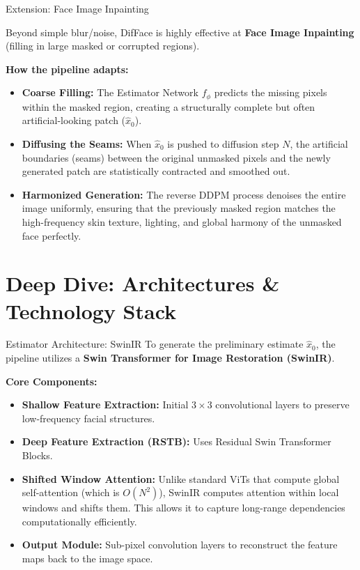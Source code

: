\documentclass[aspectratio=169]{beamer}
\begin{document}
\begin{frame}{Extension: Face Image Inpainting}
    
    
    Beyond simple blur/noise, DifFace is highly effective at \textbf{Face Image Inpainting} (filling in large masked or corrupted regions).
    
    \vspace{0.2cm}
    \textbf{How the pipeline adapts:}
    \begin{itemize}
        \item \textbf{Coarse Filling:} The Estimator Network $f_\phi$ predicts the missing pixels within the masked region, creating a structurally complete but often artificial-looking patch ($\hat{x}_0$).
        \item \textbf{Diffusing the Seams:} When $\hat{x}_0$ is pushed to diffusion step $N$, the artificial boundaries (seams) between the original unmasked pixels and the newly generated patch are statistically contracted and smoothed out.
        \item \textbf{Harmonized Generation:} The reverse DDPM process denoises the entire image uniformly, ensuring that the previously masked region matches the high-frequency skin texture, lighting, and global harmony of the unmasked face perfectly.
    \end{itemize}
\end{frame}

\section{Deep Dive: Architectures \& Technology Stack}

\begin{frame}{Estimator Architecture: SwinIR}
    To generate the preliminary estimate $\hat{x}_0$, the pipeline utilizes a \textbf{Swin Transformer for Image Restoration (SwinIR)}.
    
    \vspace{0.2cm}
    \textbf{Core Components:}
    \begin{itemize}
        \item \textbf{Shallow Feature Extraction:} Initial $3 \times 3$ convolutional layers to preserve low-frequency facial structures.
        \item \textbf{Deep Feature Extraction (RSTB):} Uses Residual Swin Transformer Blocks.
        \item \textbf{Shifted Window Attention:} Unlike standard ViTs that compute global self-attention (which is $O(N^2)$), SwinIR computes attention within local windows and shifts them. This allows it to capture long-range dependencies computationally efficiently.
        \item \textbf{Output Module:} Sub-pixel convolution layers to reconstruct the feature maps back to the image space.
    \end{itemize}
\end{frame}
\end{document}
